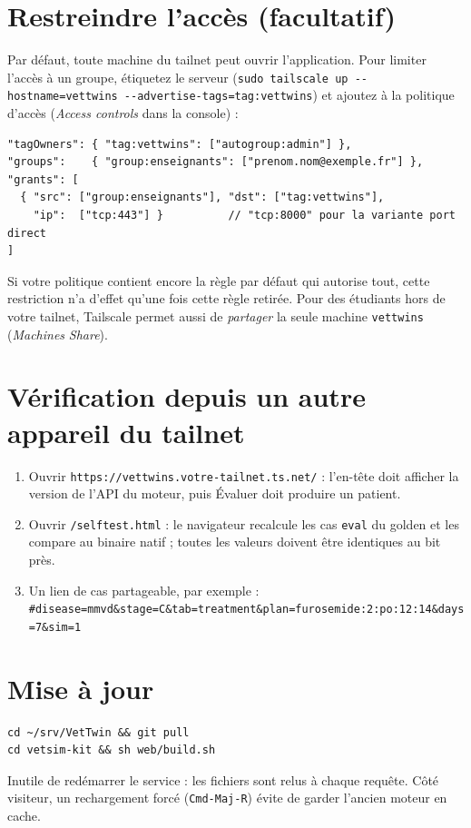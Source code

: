 \documentclass[11pt,a4paper]{article}
\newcommand{\cmd}[1]{\texttt{#1}}
\newcommand{\aremplacer}[1]{\textcolor{red!60!black}{\texttt{#1}}}
\begin{document}
\section{Restreindre l'accès (facultatif)}
Par défaut, toute machine du tailnet peut ouvrir l'application. Pour limiter l'accès à un groupe, étiquetez le serveur (\cmd{sudo tailscale up -{}-hostname=vettwins -{}-advertise-tags=tag:vettwins}) et ajoutez à la politique d'accès (\emph{Access controls} dans la console) :
\begin{Verbatim}
"tagOwners": { "tag:vettwins": ["autogroup:admin"] },
"groups":    { "group:enseignants": ["prenom.nom@exemple.fr"] },
"grants": [
  { "src": ["group:enseignants"], "dst": ["tag:vettwins"],
    "ip":  ["tcp:443"] }          // "tcp:8000" pour la variante port direct
]
\end{Verbatim}
Si votre politique contient encore la règle par défaut qui autorise tout, cette restriction n'a d'effet qu'une fois cette règle retirée. Pour des étudiants hors de votre tailnet, Tailscale permet aussi de \emph{partager} la seule machine \cmd{vettwins} (\emph{Machines} \textrightarrow{} \emph{Share}).

\section{Vérification depuis un autre appareil du tailnet}
\begin{enumerate}
  \item Ouvrir \cmd{https://vettwins.\aremplacer{votre-tailnet}.ts.net/} : l'en-tête doit afficher la version de l'API du moteur, puis \og Évaluer \fg{} doit produire un patient.
  \item Ouvrir \cmd{/selftest.html} : le navigateur recalcule les cas \cmd{eval} du golden et les compare au binaire natif ; toutes les valeurs doivent être identiques au bit près.
  \item Un lien de cas partageable, par exemple :\\
  {\small\cmd{\#disease=mmvd\&stage=C\&tab=treatment\&plan=furosemide:2:po:12:14\&days=7\&sim=1}}
\end{enumerate}

\section{Mise à jour}
\begin{Verbatim}
cd ~/srv/VetTwin && git pull
cd vetsim-kit && sh web/build.sh
\end{Verbatim}
Inutile de redémarrer le service : les fichiers sont relus à chaque requête. Côté visiteur, un rechargement forcé (\cmd{Cmd-Maj-R}) évite de garder l'ancien moteur en cache.
\end{document}

